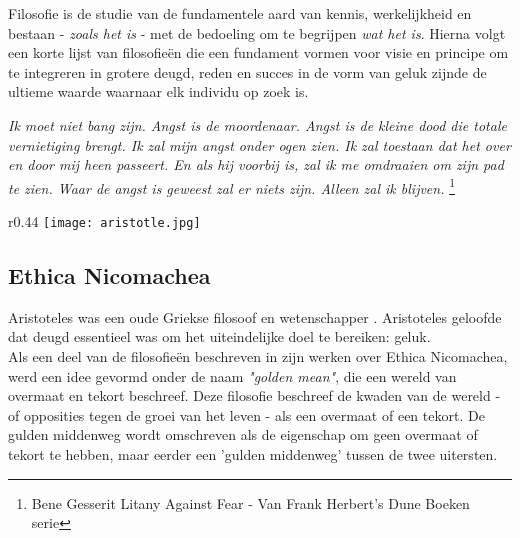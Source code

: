 \documentclass[11pt]{article}
\begin{document}
Filosofie is de studie van de fundamentele aard van kennis, werkelijkheid en bestaan - \textit{zoals het is} - met de bedoeling om te begrijpen \textit{wat het is}. 
Hierna volgt een korte lijst van filosofie\"en die een fundament vormen voor visie en principe om te integreren in grotere deugd, reden en succes in de vorm van geluk zijnde de ultieme waarde waarnaar elk individu op zoek is.

\begin{center}
\textit{
Ik moet niet bang zijn.\linebreak
Angst is de moordenaar.\linebreak
Angst is de kleine dood die totale vernietiging brengt.\linebreak
Ik zal mijn angst onder ogen zien.\linebreak
Ik zal toestaan ​​dat het over en door mij heen passeert.\linebreak
En als hij voorbij is, zal ik me omdraaien om zijn pad te zien.\linebreak
Waar de angst is geweest zal er niets zijn. \linebreak
Alleen zal ik blijven.\linebreak
}
\footnote{Bene Gesserit Litany Against Fear - Van Frank Herbert’s Dune Boeken serie}
\end{center}

\begin{wrapfigure}[17]{r}{0.44\textwidth}
    \centering
    \texttt{[image: aristotle.jpg]}
\end{wrapfigure}

\subsection{Ethica Nicomachea}

Aristoteles was een oude Griekse filosoof en wetenschapper \cite{aristotle}. 
Aristoteles geloofde dat deugd essentieel was om het uiteindelijke doel te bereiken: geluk.\\ 
\noindent Als een deel van de filosofieën beschreven in zijn werken over Ethica Nicomachea, werd een idee gevormd onder de naam \textit{"golden mean"}, die een wereld van overmaat en tekort beschreef. Deze filosofie beschreef de kwaden van de wereld - of opposities tegen de groei van het leven - als een overmaat of een tekort. De gulden middenweg wordt omschreven als de eigenschap om geen overmaat of tekort te hebben, maar eerder een 'gulden middenweg' tussen de twee uitersten.
\end{document}
